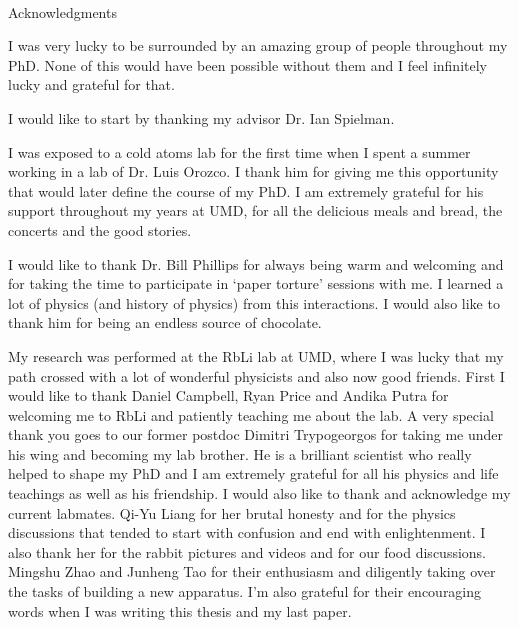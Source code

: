
\renewcommand{\baselinestretch}{2}
\small\normalsize
\hbox{\ }
 
\vspace{-.65in}

\begin{center}
\large{Acknowledgments} 
\end{center} 

\vspace{1ex}

I was very lucky to be surrounded by an amazing group of people throughout my PhD. None of this would have been possible without them and I feel infinitely lucky and grateful for that. 

I would like to start by thanking my advisor Dr. Ian Spielman. 

I was exposed to a cold atoms lab for the first time when I spent a summer working in a lab of Dr. Luis Orozco. I thank him for giving me this opportunity that would later define the course of my PhD. I am extremely grateful for his support throughout my years at UMD, for all the delicious meals and bread, the concerts and the good stories. 

I would like to thank Dr. Bill Phillips for always being  warm and welcoming and for taking the time to participate in `paper torture' sessions with me. I learned a lot of physics (and history of physics) from this interactions. I would also like to thank him for being an endless source of chocolate. 

My research was performed at the RbLi lab at UMD, where I was lucky  that my path crossed with a lot of wonderful physicists and also now good friends. First I would like to thank  Daniel Campbell, Ryan Price and Andika Putra for welcoming me to RbLi and patiently teaching me about the lab. A very special thank you goes to our former postdoc Dimitri Trypogeorgos for taking me under his wing and becoming my lab brother. He is a brilliant scientist who really helped to shape my PhD and I am extremely grateful for all his physics and life teachings as well as his friendship. I would also like to thank and acknowledge my current labmates. Qi-Yu Liang for her brutal honesty and for the physics discussions that tended to start with confusion and end with enlightenment. I also thank her for the rabbit pictures and videos and for our food discussions. Mingshu Zhao and Junheng Tao for their enthusiasm and diligently taking over the tasks of building a new apparatus. I'm also grateful for their encouraging words when I was writing this thesis and my last paper. 

